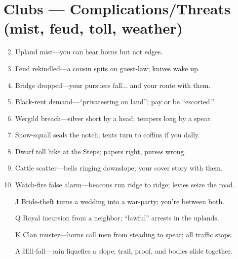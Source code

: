 \section*{Clubs --- Complications/Threats (mist, feud, toll, weather)}
\begin{enumerate}
\setcounter{enumi}{1}
\item Upland mist---you can hear horns but not edges.
\item Feud rekindled---a cousin spits on guest-law; knives wake up.
\item Bridge dropped---your pursuers fall... and your route with them.
\item Black-rent demand---``privateering on land''; pay or be ``escorted.''
\item Wergild breach---silver short by a head; tempers long by a spear.
\item Snow-squall seals the notch; tents turn to coffins if you dally.
\item Dwarf toll hike at the Steps; papers right, purses wrong.
\item Cattle scatter---bells ringing downslope; your cover story with them.
\item Watch-fire false alarm---beacons run ridge to ridge; levies seize the road.
\item[J] Bride-theft turns a wedding into a war-party; you're between both.
\item[Q] Royal incursion from a neighbor; ``lawful'' arrests in the uplands.
\item[K] Clan muster---horns call men from steading to spear; all traffic stops.
\item[A] Hill-fall---rain liquefies a slope; trail, proof, and bodies slide together.
\end{enumerate}

